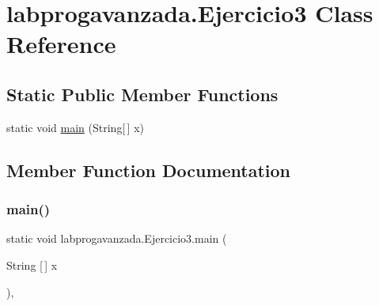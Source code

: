 \hypertarget{classlabprogavanzada_1_1_ejercicio3}{}\section{labprogavanzada.\+Ejercicio3 Class Reference}
\label{classlabprogavanzada_1_1_ejercicio3}
\subsection*{Static Public Member Functions}
\begin{DoxyCompactItemize}
\item 
static void \mbox{\hyperlink{classlabprogavanzada_1_1_ejercicio3_ada03b858e6255b39438c1d38cd0c6a28}{main}} (String\mbox{[}$\,$\mbox{]} x)
\end{DoxyCompactItemize}


\subsection{Member Function Documentation}
\mbox{\label{classlabprogavanzada_1_1_ejercicio3_ada03b858e6255b39438c1d38cd0c6a28}} 
\subsubsection{\texorpdfstring{main()}{main()}}
{\footnotesize\ttfamily static void labprogavanzada.\+Ejercicio3.\+main (\begin{DoxyParamCaption}\item[{String \mbox{[}$\,$\mbox{]}}]{x }\end{DoxyParamCaption})\hspace{0.3cm}{\ttfamily [inline]}, {\ttfamily [static]}}


